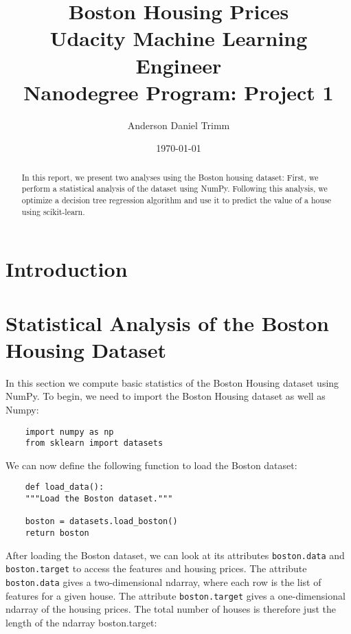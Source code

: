 \documentclass[12 pt]{article}
\numberwithin{equation}{section}
\begin{document}
\title{Boston Housing Prices \\ \footnotesize{Udacity Machine Learning Engineer \\ Nanodegree Program: Project 1}}
\author{Anderson Daniel Trimm}
\date{\today}
\maketitle
\begin{abstract}
In this report, we present two analyses using the Boston housing dataset: First, we perform a statistical analysis of the dataset using NumPy. Following this analysis, we optimize a decision tree regression algorithm and use it to predict the value of a house using scikit-learn. 
\end{abstract}
\section{Introduction}
\section{Statistical Analysis of the Boston Housing Dataset}
In this section we compute basic statistics of the Boston Housing dataset using NumPy. To begin, we need to import the Boston Housing dataset as well as Numpy:

\begin{verbatim}
	import numpy as np
	from sklearn import datasets
\end{verbatim}

We can now define the following function to load the Boston dataset:

\begin{verbatim}
	def load_data():
    """Load the Boston dataset."""

    boston = datasets.load_boston()
    return boston
\end{verbatim}
After loading the Boston dataset, we can look at its attributes \texttt{boston.data} and \texttt{boston.target} to access the features and housing prices. The attribute \texttt{boston.data} gives a two-dimensional ndarray, where each row is the list of features for a given house. The attribute \texttt{boston.target} gives a one-dimensional ndarray of the housing prices. The total number of houses is therefore just the length of the ndarray boston.target:
\end{document}
